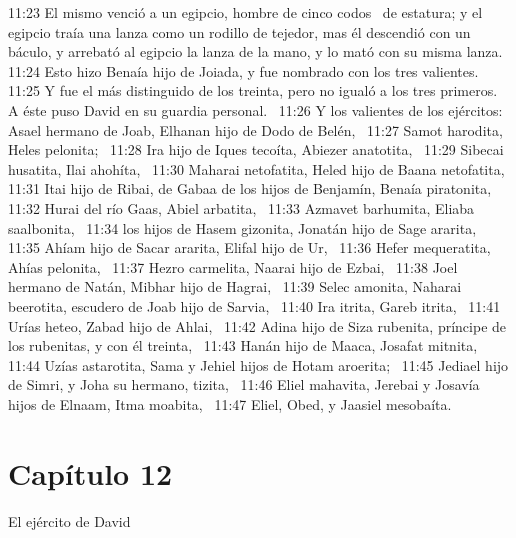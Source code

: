 11:23 El mismo venció a un egipcio, hombre de cinco codos  de estatura; y el egipcio traía una lanza como un rodillo de tejedor, mas él descendió con un báculo, y arrebató al egipcio la lanza de la mano, y lo mató con su misma lanza.  
11:24 Esto hizo Benaía hijo de Joiada, y fue nombrado con los tres valientes.  
11:25 Y fue el más distinguido de los treinta, pero no igualó a los tres primeros. A éste puso David en su guardia personal.  
11:26 Y los valientes de los ejércitos: Asael hermano de Joab, Elhanan hijo de Dodo de Belén,  
11:27 Samot harodita, Heles pelonita;  
11:28 Ira hijo de Iques tecoíta, Abiezer anatotita,  
11:29 Sibecai husatita, Ilai ahohíta,  
11:30 Maharai netofatita, Heled hijo de Baana netofatita,  
11:31 Itai hijo de Ribai, de Gabaa de los hijos de Benjamín, Benaía piratonita,  
11:32 Hurai del río Gaas, Abiel arbatita,  
11:33 Azmavet barhumita, Eliaba saalbonita,  
11:34 los hijos de Hasem gizonita, Jonatán hijo de Sage ararita,  
11:35 Ahíam hijo de Sacar ararita, Elifal hijo de Ur,  
11:36 Hefer mequeratita, Ahías pelonita,  
11:37 Hezro carmelita, Naarai hijo de Ezbai,  
11:38 Joel hermano de Natán, Mibhar hijo de Hagrai,  
11:39 Selec amonita, Naharai beerotita, escudero de Joab hijo de Sarvia,  
11:40 Ira itrita, Gareb itrita,  
11:41 Urías heteo, Zabad hijo de Ahlai,  
11:42 Adina hijo de Siza rubenita, príncipe de los rubenitas, y con él treinta,  
11:43 Hanán hijo de Maaca, Josafat mitnita,  
11:44 Uzías astarotita, Sama y Jehiel hijos de Hotam aroerita;  
11:45 Jediael hijo de Simri, y Joha su hermano, tizita,  
11:46 Eliel mahavita, Jerebai y Josavía hijos de Elnaam, Itma moabita,  
11:47 Eliel, Obed, y Jaasiel mesobaíta.  
\section*{Capítulo 12}
El ejército de David  

